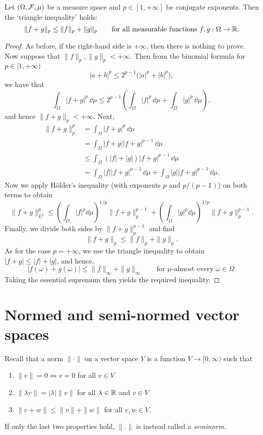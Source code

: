 \begin{proposition}
	Let $(\Omega,\mathcal F,\mu)$ be a measure space and $p\in[1,+\infty]$ be conjugate exponents. Then the `triangle inequality' holds:
\[
	\|f + g\|_p \leq \|f\|_p + \|g \|_p\qquad \text{for all measurable functions $f,g:\Omega\to\mathbb R$}.
\]
\end{proposition}
\begin{proof}
As before, if the right-hand side is $+\infty$, then there is nothing to prove. Now suppose that $\|f\|_p,\|g\|_p<+\infty$. Then from the binomial formula for $p
\in[1,+\infty)$
\[
	|a+b|^p \le 2^{p-1}\bigl(|a|^p + |b|^p\bigr),
\]
we have that
\[
	\int_\Omega |f+g|^p\,\dd\mu \le 2^{p-1}\left(\int_\Omega |f|^p\,\dd\mu + \int_\Omega |g|^p\,\dd\mu\right),
\]
and hence $\|f+g\|_p<+\infty$. Next,
\[
\begin{split}
\|f + g\|^p_{p}
&= \int_\Omega |f + g|^p \,\dd \mu \\
&= \int_\Omega |f + g| |f + g|^{p-1} \,\dd \mu \\
&\leq \int_\Omega (|f| + |g|) |f + g|^{p-1} \,\dd \mu \\
&= \int_\Omega |f| |f+g|^{p-1} \,\dd \mu + \int_\Omega |g | |f+g|^{p-1} \,\dd \mu.
\end{split}
\]
Now we apply H\"older's inequality (with exponents $p$ and $p/(p-1)$) on both terms to obtain
\[
\|f+g\|^p_{L^p} \le \left(\int_\Omega |f|^p \dd \mu\right)^{1/p}  \|f+ g\|_p^{{p-1}} + \left(\int_\Omega |g|^p \dd \mu\right)^{1/p}  \|f+ g\|_p^{{p-1}}.
\]
Finally, we divide both sides by $\|f + g\|_p^{p-1}$ and find
\[
\|f+g\|_p \leq \|f\|_p + \|g\|_p.
\]
As for the case $p=+\infty$, we use the triangle inequality to obtain $|f+g|\le |f| + |g|$, and hence,
\[
	|f(\omega)+g(\omega)| \le \|f\|_\infty + \|g\|_\infty\qquad\text{for $\mu$-almost every $\omega\in\Omega$}.
\]
Taking the essential supremum then yields the required inequality.
\end{proof}

\section{Normed and semi-normed vector spaces}
\label{se:normed-and-seminormed-spaces}

Recall that a norm $\| \cdot \|$ on a vector space $V$ is a function $V \to [0,\infty)$ such that
\begin{enumerate}
\item $\|v\|= 0 \Leftrightarrow v = 0$ for all $v \in V$
\item $\|\lambda v \| = |\lambda| \|v\|$ for all $\lambda \in \mathbb R$ and $v \in V$
\item $\|v + w\| \leq \|v\| + \|w \|$ for all $v, w \in V$.
\end{enumerate}
If only the last two properties hold, $\|. \|$ is instead called a \emph{seminorm}.

